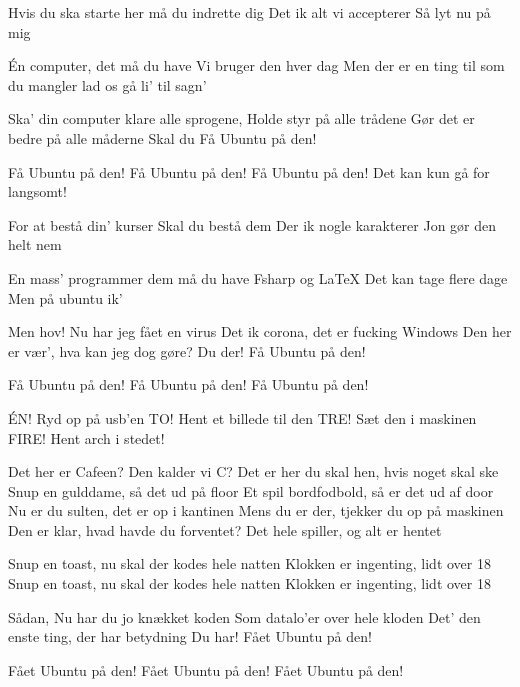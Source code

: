 \documentclass[a4paper,11pt]{article}
\begin{document}
\begin{song}

 Hvis du ska starte her må
du indrette dig
Det ik alt vi accepterer
Så lyt nu på mig

Én computer, det må du have
Vi bruger den hver dag
Men der er en ting til som du mangler
lad os gå li' til sagn'

 Ska' din computer  klare alle sprogene,
Holde styr på alle trådene
Gør det er bedre på alle måderne
Skal du
  Få Ubuntu på den!

Få Ubuntu på den!
Få Ubuntu på den!
Få Ubuntu på den!
Det kan kun gå for langsomt!

For at bestå din' kurser
Skal du bestå dem
Der ik nogle karakterer
Jon gør den helt nem

En mass' programmer dem må du have 
Fsharp og LaTeX
Det kan tage flere dage
Men på ubuntu ik'

Men hov! Nu har jeg fået en virus
Det ik corona, det er fucking Windows
Den her er vær', hva kan jeg dog gøre?
Du der!
  Få Ubuntu på den!

Få Ubuntu på den!
Få Ubuntu på den!
Få Ubuntu på den!

ÉN! Ryd op på usb'en
TO! Hent et billede til den
TRE! Sæt den i maskinen
FIRE! Hent arch i stedet!%

Det her er Cafeen? Den kalder vi C?
Det er her du skal hen, hvis noget skal ske
Snup en gulddame, så det ud på floor
Et spil bordfodbold, så er det ud af door
Nu er du sulten, det er op i kantinen
Mens du er der, tjekker du op på maskinen
Den er klar, hvad havde du forventet?
Det hele spiller, og alt er hentet

Snup en toast, nu skal der kodes hele natten
Klokken er ingenting, lidt over 18 
Snup en toast, nu skal der kodes hele natten
Klokken er ingenting, lidt over 18

 Sådan, Nu har du jo knækket koden
Som datalo'er over hele kloden
Det' den enste ting, der har betydning
Du har! 
 Fået Ubuntu på den!

Fået Ubuntu på den!
Fået Ubuntu på den!
Fået Ubuntu på den!







\end{song}
\end{document}
